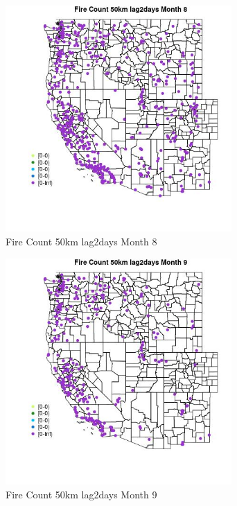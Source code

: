 \begin{figure} 
\centering  
\includegraphics[width=0.77\textwidth]{Code_Outputs/Report_ML_input_PM25_Step4_part_e_de_duplicated_aves_compiled_2019-05-18wNAs_MapObsMo8Fire_Count_50km_lag2days.jpg} 
\caption{\label{fig:Report_ML_input_PM25_Step4_part_e_de_duplicated_aves_compiled_2019-05-18wNAsMapObsMo8Fire_Count_50km_lag2days}Fire Count 50km lag2days Month 8} 
\end{figure} 
 

\begin{figure} 
\centering  
\includegraphics[width=0.77\textwidth]{Code_Outputs/Report_ML_input_PM25_Step4_part_e_de_duplicated_aves_compiled_2019-05-18wNAs_MapObsMo9Fire_Count_50km_lag2days.jpg} 
\caption{\label{fig:Report_ML_input_PM25_Step4_part_e_de_duplicated_aves_compiled_2019-05-18wNAsMapObsMo9Fire_Count_50km_lag2days}Fire Count 50km lag2days Month 9} 
\end{figure} 
 

